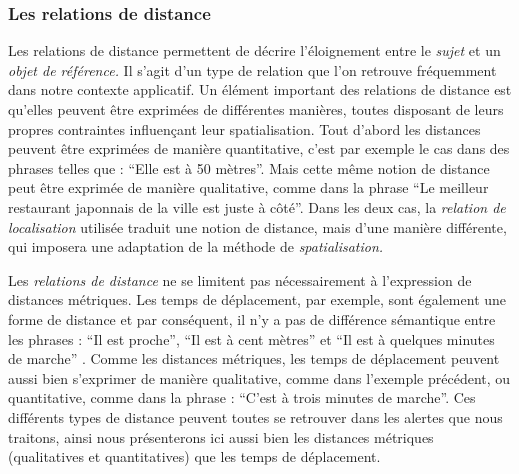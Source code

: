 \subsubsection{Les relations de distance}




Les relations de distance permettent de décrire l'éloignement entre le
\emph{sujet} et un \emph{objet de référence.} Il s'agit d'un type de
relation que l'on retrouve fréquemment dans notre contexte applicatif.
Un élément important des relations de distance est qu'elles peuvent
être exprimées de différentes manières, toutes disposant de leurs
propres contraintes influençant leur spatialisation. Tout d'abord les
distances peuvent être exprimées de manière quantitative, c'est par
exemple le cas dans des phrases telles que : \enquote{Elle est à 50
  mètres}. Mais cette même notion de distance peut être exprimée de
manière qualitative, comme dans la phrase \enquote{Le meilleur
  restaurant japonnais de la ville est juste à côté}. Dans les deux
cas, la \emph{relation de localisation} utilisée traduit une notion de
distance, mais d'une manière différente, qui imposera une adaptation
de la méthode de \emph{spatialisation.}

Les \emph{relations de distance} ne se limitent pas nécessairement à
l'expression de distances métriques. Les temps de déplacement, par
exemple, sont également une forme de distance et par conséquent, il
n'y a pas de différence sémantique entre les phrases : \enquote{Il est
  proche}, \enquote{Il est à cent mètres} et \enquote{Il est à
  quelques minutes de marche} \autocite{Borillo1998,
  Egenhofer1995}. Comme les distances métriques, les temps de
déplacement peuvent aussi bien s'exprimer de manière qualitative,
comme dans l'exemple précédent, ou quantitative, comme dans la phrase
: \enquote{C'est à trois minutes de marche}.  Ces différents types de
distance peuvent toutes se retrouver dans les alertes que nous
traitons, ainsi nous présenterons ici aussi bien les distances
métriques (qualitatives et quantitatives) que les temps de
déplacement.

